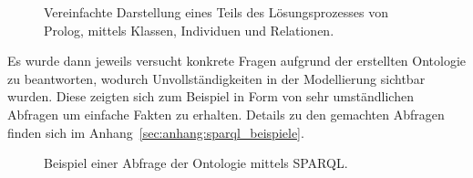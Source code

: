 \begin{figure}[H]
\centering {}
\caption{Vereinfachte Darstellung eines Teils des Lösungsprozesses von Prolog, mittels Klassen, Individuen und Relationen.\label{fig:prolog_loesungsprozess}\protect\footnotemark}
\end{figure}

Es wurde dann jeweils versucht konkrete Fragen aufgrund der erstellten Ontologie zu beantworten, wodurch Unvollständigkeiten in der Modellierung  sichtbar wurden. Diese zeigten sich zum Beispiel in Form von sehr umständlichen Abfragen um einfache Fakten zu erhalten. Details zu den gemachten Abfragen finden sich im Anhang~\ref{sec:anhang:sparql_beispiele}.

\begin{figure}[H]
\centering {}
\caption{Beispiel einer Abfrage der Ontologie mittels SPARQL.\label{fig:sparql_beispiel}\protect\footnotemark}
\end{figure}

